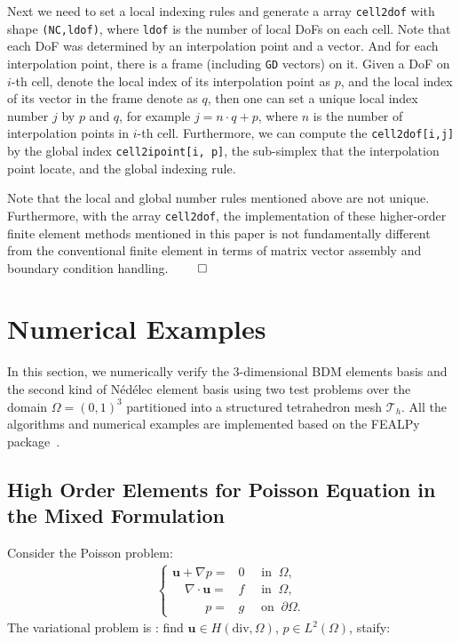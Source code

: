 \documentclass[mathpazo]{cicp}
\begin{document}
Next we need to set a local indexing rules and generate a array
\lstinline{cell2dof} with shape \lstinline{(NC,ldof)}, where \lstinline{ldof}
is the number of local DoFs on each cell. Note that each DoF was determined by an
interpolation point and a vector. And for each interpolation point, there is a frame
(including \lstinline{GD} vectors) on it. Given a DoF on $i$-th cell, denote the
local index  of its interpolation point as $p$, and the local index 
of its vector in the frame denote as $q$, then one can set a unique local index
number $j$ by $p$ and $q$, for example
$j = n\cdot q + p$,
where $n$ is the number of interpolation points in $i$-th cell.  Furthermore, 
we can compute the \lstinline{cell2dof[i,j]} by the global index 
\lstinline{cell2ipoint[i, p]}, the sub-simplex that the interpolation point
locate, and the global indexing rule. 

\begin{remark}\rm 
  Note that the local and global number rules  mentioned above are not unique.
  Furthermore, with the array \lstinline{cell2dof}, the implementation of these higher-order
  finite element methods mentioned in this paper is not fundamentally different
  from the conventional finite element in terms of matrix vector assembly and
  boundary condition handling. $\qed$
\end{remark}


\section{Numerical Examples}\label{sec:numerexamples}

In this section, we numerically verify the 3-dimensional BDM elements basis and the second kind
of N\'ed\'elec element basis using two test problems over the domain $\Omega =
(0, 1)^3$ partitioned into a structured tetrahedron mesh $\mathcal T_h$. All the algorithms and numerical examples are implemented based on
the FEALPy package~\cite{FEALPy}.



\subsection{High Order Elements for Poisson Equation in the Mixed Formulation}
Consider the Poisson problem:
$$
\begin{aligned}
  \left\{
    \begin{aligned}
      \boldsymbol u + \nabla p ={}& 0 \quad \text{ in } \ \Omega,\\
      \quad \nabla \cdot \boldsymbol u ={}& f\quad \text{ in } \ \Omega,\\
      \quad \quad \ \ \  p ={}& g \quad \text{ on } \ \partial \Omega.
    \end{aligned}
  \right.
\end{aligned}
$$
The variational problem is : find 
$\boldsymbol u \in H(\mathrm{div}, \Omega)$, $p \in L^2(\Omega)$, staify:
\end{document}

